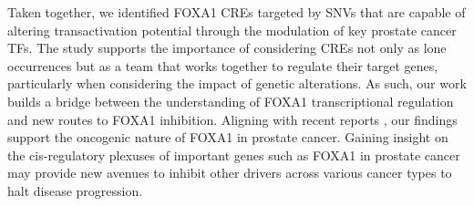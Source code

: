 Taken together, we identified FOXA1 CREs targeted by SNVs that are capable of altering transactivation potential through the modulation of key prostate cancer TFs.
The study supports the importance of considering CREs not only as lone occurrences but as a team that works together to regulate their target genes, particularly when considering the impact of genetic alterations.
As such, our work builds a bridge between the understanding of FOXA1 transcriptional regulation and new routes to FOXA1 inhibition.
Aligning with recent reports \cite{paroliaDistinctStructuralClasses2019,adamsFOXA1MutationsAlter2019,gaoForkheadDomainMutations2019}, our findings support the oncogenic nature of FOXA1 in prostate cancer.
Gaining insight on the cis-regulatory plexuses of important genes such as FOXA1 in prostate cancer may provide new avenues to inhibit other drivers across various cancer types to halt disease progression.
